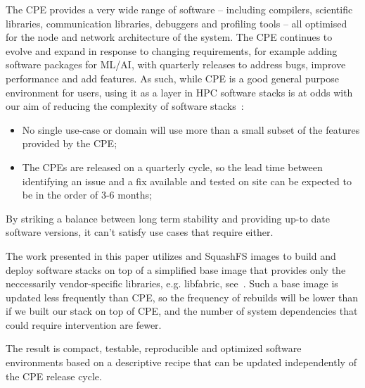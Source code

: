 The CPE provides a very wide range of software -- including compilers, scientific libraries, communication libraries, debuggers and profiling tools -- all optimised for the node and network architecture of the system.
The CPE continues to evolve and expand in response to changing requirements, for example adding software packages for ML/AI, with quarterly releases to address bugs, improve performance and add features.
As such, while CPE is a good general purpose environment for users, using it as a layer in HPC software stacks is at odds with our aim of reducing the complexity of software stacks~:
\begin{itemize}
    \item No single use-case or domain will use more than a small subset of the features provided by the CPE;
    \item The CPEs are released on a quarterly cycle, so the lead time between identifying an issue and a fix available and tested on site can be expected to be in the order of 3-6 months;
\end{itemize}
By striking a balance between long term stability and providing up-to date software versions, it can't satisfy use cases that require either.

The work presented in this paper utilizes \spack and SquashFS images to build and deploy software stacks on top of a simplified base image that provides only the neccessarily vendor-specific libraries, e.g. libfabric, see~.
Such a base image is updated less frequently than CPE, so the frequency of rebuilds will be lower than if we built our stack on top of CPE, and the number of system dependencies that could require intervention are fewer.

The result is compact, testable, reproducible and optimized software environments based on a descriptive recipe that can be updated independently of the CPE release cycle.


